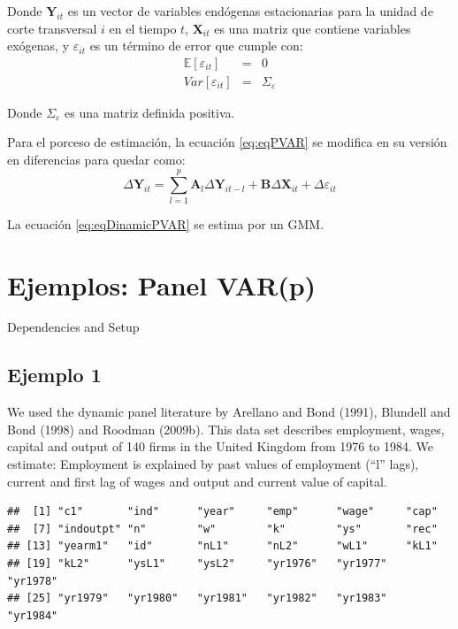 \documentclass[
]{book}
\begin{document}
Donde \(\mathbf{Y}_{it}\) es un vector de variables endógenas estacionarias para la unidad de corte transversal \(i\) en el tiempo \(t\), \(\mathbf{X}_{it}\) es una matriz que contiene variables exógenas, y \(\varepsilon_{it}\) es un término de error que cumple con:
\begin{eqnarray*}
    \mathbb{E}[\varepsilon_{it}] & = & 0 \\
    Var[\varepsilon_{it}] & = & \Sigma_\varepsilon
\end{eqnarray*}

Donde \(\Sigma_\varepsilon\) es una matriz definida positiva.

Para el porceso de estimación, la ecuación \eqref{eq:eqPVAR} se modifica en su versión en diferencias para quedar como:
\begin{equation}
    \Delta \mathbf{Y}_{it} = \sum_{l = 1}^p \mathbf{A}_l \Delta \mathbf{Y}_{i t - l} + \mathbf{B} \Delta \mathbf{X}_{it} + \Delta \varepsilon_{it}
    \label{eq:eqDinamicPVAR}
\end{equation}

La ecuación \eqref{eq:eqDinamicPVAR} se estima por un GMM.

\hypertarget{ejemplos-panel-varp}{%
\section{Ejemplos: Panel VAR(p)}\label{ejemplos-panel-varp}}

Dependencies and Setup

\hypertarget{ejemplo-1}{%
\subsection{Ejemplo 1}\label{ejemplo-1}}

We used the dynamic panel literature by Arellano and Bond (1991), Blundell and Bond (1998) and Roodman (2009b).
This data set describes employment, wages, capital and output of 140 firms in the United Kingdom from 1976 to 1984.
We estimate: Employment is explained by past values of employment (``l'' lags), current and first lag of wages and output and current value of capital.

\begin{verbatim}
##  [1] "c1"       "ind"      "year"     "emp"      "wage"     "cap"     
##  [7] "indoutpt" "n"        "w"        "k"        "ys"       "rec"     
## [13] "yearm1"   "id"       "nL1"      "nL2"      "wL1"      "kL1"     
## [19] "kL2"      "ysL1"     "ysL2"     "yr1976"   "yr1977"   "yr1978"  
## [25] "yr1979"   "yr1980"   "yr1981"   "yr1982"   "yr1983"   "yr1984"
\end{verbatim}
\end{document}
